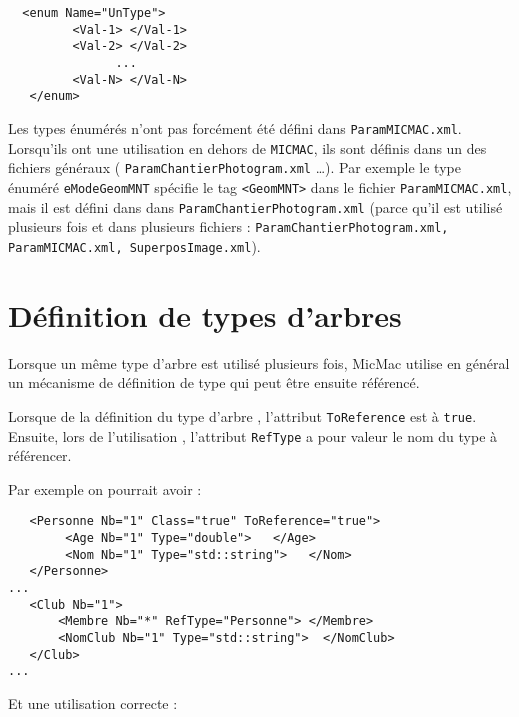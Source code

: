 \begin{verbatim}
  <enum Name="UnType">
         <Val-1> </Val-1>
         <Val-2> </Val-2>
               ...
         <Val-N> </Val-N>
   </enum>

\end{verbatim}


Les types \'enum\'er\'es n'ont pas forc\'ement \'et\'e d\'efini dans {\tt ParamMICMAC.xml}.
Lorsqu'ils ont une utilisation en dehors de {\tt MICMAC}, ils sont d\'efinis dans un
des fichiers  g\'en\'eraux ( {\tt ParamChantierPhotogram.xml} \dots). Par exemple
le type \'enum\'er\'e {\tt eModeGeomMNT} sp\'ecifie le tag {\tt <GeomMNT>}
dans le fichier {\tt ParamMICMAC.xml}, mais il est d\'efini dans 
dans {\tt ParamChantierPhotogram.xml} (parce qu'il est utilis\'e plusieurs
fois et dans plusieurs fichiers : 
{\tt ParamChantierPhotogram.xml, ParamMICMAC.xml, SuperposImage.xml}).




\section{D\'efinition de types d'arbres}

\label{Def:Type:Arbre}

Lorsque un m\^eme type d'arbre est utilis\'e plusieurs fois,
MicMac utilise en g\'en\'eral un m\'ecanisme de d\'efinition
de type qui peut \^etre ensuite r\'ef\'erenc\'e.

Lorsque de la   d\'efinition du type d'arbre , l'attribut {\tt ToReference}
est \`a {\tt true}. Ensuite, lors de l'utilisation ,
l'attribut {\tt RefType} a pour valeur le nom du
type \`a r\'ef\'erencer.

Par exemple on pourrait avoir :

\begin{verbatim}
   <Personne Nb="1" Class="true" ToReference="true">
        <Age Nb="1" Type="double">   </Age>
        <Nom Nb="1" Type="std::string">   </Nom>
   </Personne>
...
   <Club Nb="1">
       <Membre Nb="*" RefType="Personne"> </Membre>
       <NomClub Nb="1" Type="std::string">  </NomClub>
   </Club>
...
\end{verbatim}

Et une utilisation correcte :

